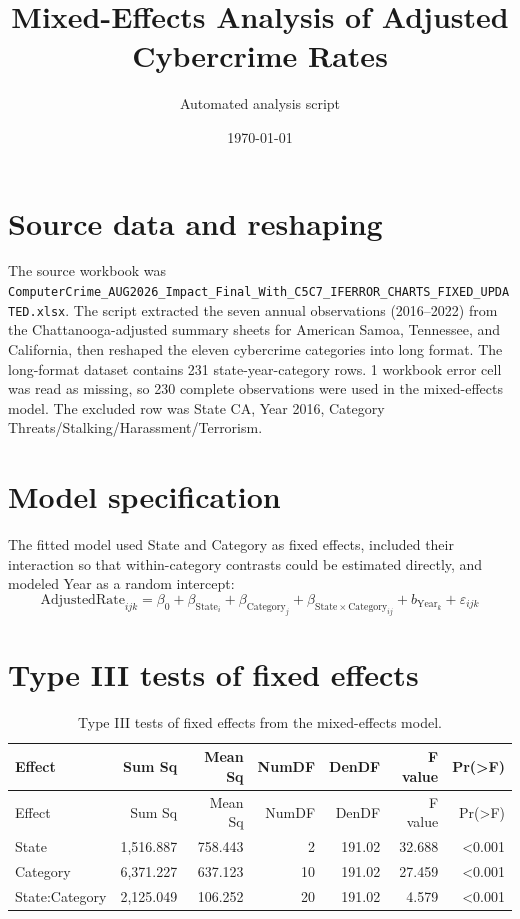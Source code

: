 \documentclass[11pt]{article}
\begin{document}
\title{Mixed-Effects Analysis of Adjusted Cybercrime Rates}
\author{Automated analysis script}
\date{\today}
\maketitle
\section{Source data and reshaping}
The source workbook was \texttt{ComputerCrime\_AUG2026\_Impact\_Final\_With\_C5C7\_IFERROR\_CHARTS\_FIXED\_UPDATED.xlsx}. The script extracted the seven annual observations (2016--2022) from the Chattanooga-adjusted summary sheets for American Samoa, Tennessee, and California, then reshaped the eleven cybercrime categories into long format.
The long-format dataset contains 231 state-year-category rows. 1 workbook error cell was read as missing, so 230 complete observations were used in the mixed-effects model.
The excluded row was State CA, Year 2016, Category Threats/Stalking/Harassment/Terrorism.
\section{Model specification}
The fitted model used State and Category as fixed effects, included their interaction so that within-category contrasts could be estimated directly, and modeled Year as a random intercept:
\[
\mathrm{AdjustedRate}_{ijk} = \beta_0 + \beta_{\mathrm{State}_i} + \beta_{\mathrm{Category}_j} + \beta_{\mathrm{State}\times\mathrm{Category}_{ij}} + b_{\mathrm{Year}_k} + \varepsilon_{ijk}
\]
\section{Type III tests of fixed effects}
\begin{longtable}{lrrrrrr}
\caption{Type III tests of fixed effects from the mixed-effects model.}\label{tab:type3}\\
\toprule
Effect & Sum Sq & Mean Sq & NumDF & DenDF & F value & Pr(>F) \\
\midrule
\endfirsthead
\toprule
Effect & Sum Sq & Mean Sq & NumDF & DenDF & F value & Pr(>F) \\
\midrule
\endhead
State & 1,516.887 & 758.443 & 2 & 191.02 & 32.688 & <0.001 \\
Category & 6,371.227 & 637.123 & 10 & 191.02 & 27.459 & <0.001 \\
State:Category & 2,125.049 & 106.252 & 20 & 191.02 & 4.579 & <0.001 \\
\bottomrule
\end{longtable}
\end{document}
